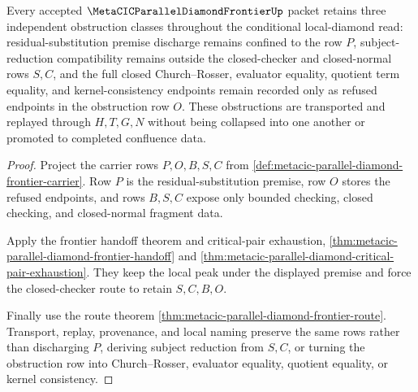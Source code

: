 \begin{theorem}
\label{thm:metacic-parallel-diamond-frontier-obstruction-triad}
Every accepted $\MetaCICParallelDiamondFrontierUp$ packet retains three independent obstruction classes throughout the conditional local-diamond read: residual-substitution premise discharge remains confined to the row $P$, subject-reduction compatibility remains outside the closed-checker and closed-normal rows $S,C$, and the full closed Church--Rosser, evaluator equality, quotient term equality, and kernel-consistency endpoints remain recorded only as refused endpoints in the obstruction row $O$. These obstructions are transported and replayed through $H,T,G,N$ without being collapsed into one another or promoted to completed confluence data.
\end{theorem}
\begin{proof}
Project the carrier rows $P,O,B,S,C$ from \autoref{def:metacic-parallel-diamond-frontier-carrier}. Row $P$ is the residual-substitution premise, row $O$ stores the refused endpoints, and rows $B,S,C$ expose only bounded checking, closed checking, and closed-normal fragment data.

Apply the frontier handoff theorem and critical-pair exhaustion, \autoref{thm:metacic-parallel-diamond-frontier-handoff} and \autoref{thm:metacic-parallel-diamond-critical-pair-exhaustion}. They keep the local peak under the displayed premise and force the closed-checker route to retain $S,C,B,O$.

Finally use the route theorem \autoref{thm:metacic-parallel-diamond-frontier-route}. Transport, replay, provenance, and local naming preserve the same rows rather than discharging $P$, deriving subject reduction from $S,C$, or turning the obstruction row into Church--Rosser, evaluator equality, quotient equality, or kernel consistency.
\end{proof}

